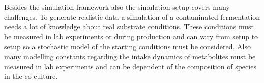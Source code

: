 
Besides the simulation framework also the simulation setup covers many challenges. To generate realistic data a simulation of a contaminated
fermentation needs a lot of knowledge about real substrate conditions. These conditions must be measured in lab experiments or during
production and can vary from setup to setup so a stochastic model of the starting conditions must be considered.
Also many modelling constants regarding the intake dynamics of metabolites must be measured in lab experiments and can be dependent of the
composition of species in the co-culture.

